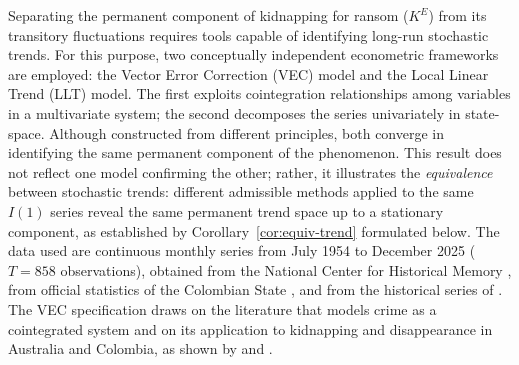 \documentclass[ecta,nameyear,draft]{econsocart}
\theoremstyle{plain}
\theoremstyle{definition}
\newcommand{\1}{\mathbf{1}}
\begin{document}
Separating the permanent component of kidnapping for ransom ($K^E$) from its transitory fluctuations requires tools capable of identifying long-run stochastic trends. For this purpose, two conceptually independent econometric frameworks are employed: the Vector Error Correction (VEC) model and the Local Linear Trend (LLT) model. The first exploits cointegration relationships among variables in a multivariate system; the second decomposes the series univariately in state-space. Although constructed from different principles, both converge in identifying the same permanent component of the phenomenon. This result does not reflect one model confirming the other; rather, it illustrates the \emph{equivalence} between stochastic trends: different admissible methods applied to the same $I(1)$ series reveal the same permanent trend space up to a stationary component, as established by Corollary~\ref{cor:equiv-trend} formulated below. The data used are continuous monthly series from July 1954 to December 2025 ($T=858$ observations), obtained from the National Center for Historical Memory \citet{CNMH2013, cnmh_datos}, from official statistics of the Colombian State \citet{mindefensa_stats}, and from the historical series of \citet{banrep_series_historicas}. The VEC specification draws on the literature that models crime as a cointegrated system and on its application to kidnapping and disappearance in Australia and Colombia, as shown by \citet{Masih1995} and \citet{Suarez_2025}.

\end{document}
